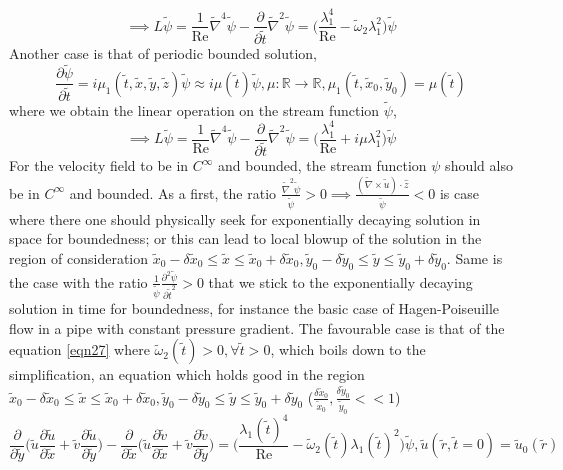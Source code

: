 \documentclass{article}
\begin{document}
\begin{equation} \label{eqn27}
\implies L \tilde{\psi} =  \frac{1}{\operatorname{Re}}\tilde{\nabla}^4 \tilde{\psi} - \frac{\partial}{\partial \tilde{t}} \tilde{\nabla}^2 \tilde{\psi} = \bigg(\frac{\lambda_1^4}{\operatorname{Re}}-\tilde{\omega}_2\lambda_1^2\bigg)\tilde{\psi}
\end{equation}
Another case is that of periodic bounded solution,
\begin{equation*}
\frac{\partial \tilde{\psi}}{\partial \tilde{t}} = i\mu_1(\tilde{t},\tilde{x}, \tilde{y}, \tilde{z}) \tilde{\psi} \approx i\mu(\tilde{t})\tilde{\psi}, \mu :\mathbb{R}\to\mathbb{R}, \mu_1(\tilde{t},\tilde{x}_0,\tilde{y}_0) = \mu(\tilde{t})
\end{equation*}
where we obtain the linear operation on the stream function $\tilde{\psi}$,
\begin{equation*}
\implies L \tilde{\psi} =  \frac{1}{\operatorname{Re}}\tilde{\nabla}^4 \tilde{\psi} - \frac{\partial}{\partial \tilde{t}} \tilde{\nabla}^2 \tilde{\psi} = \bigg(\frac{\lambda_1^4}{\operatorname{Re}}+i\mu\lambda_1^2\bigg)\tilde{\psi}
\end{equation*}
For the velocity field to be in $C^{\infty}$ and bounded, the stream function $\psi$ should also be in $C^{\infty}$ and bounded. As a first, the ratio $\frac{\tilde{\nabla}^2 \tilde{\psi}}{\tilde{\psi}} > 0 \implies \frac{(\tilde{\nabla}\times\tilde{u})\cdot\hat{z}}{\tilde{\psi}} < 0$ is case where there one should physically seek for exponentially decaying solution in space for boundedness; or this can lead to local blowup of the solution in the region of consideration $\tilde{x}_0 - \delta \tilde{x}_0 \le \tilde{x} \le \tilde{x}_0 + \delta \tilde{x}_0, \tilde{y}_0 - \delta \tilde{y}_0 \le \tilde{y} \le \tilde{y}_0 + \delta \tilde{y}_0$. Same is the case with the ratio $\frac{1}{\tilde{\psi}}\frac{\partial^2 \tilde{\psi}}{\partial \tilde{t}^2} > 0$ that we stick to the exponentially decaying solution in time for boundedness, for instance the basic case of Hagen-Poiseuille flow in a pipe with constant pressure gradient. The favourable case is that of the equation \ref{eqn27} where $\tilde{\omega}_2(\tilde{t}) > 0, \forall \tilde{t} > 0$, which boils down to the simplification, an equation which holds good in the region $\tilde{x}_0 - \delta \tilde{x}_0 \le \tilde{x} \le \tilde{x}_0 + \delta \tilde{x}_0, \tilde{y}_0 - \delta \tilde{y}_0 \le \tilde{y} \le \tilde{y}_0 + \delta \tilde{y}_0$ ($\frac{\delta \tilde{x}_0}{\tilde{x}_0}, \frac{\delta \tilde{y}_0}{\tilde{y}_0} << 1$)
\begin{equation*}
\frac{\partial}{\partial \tilde{y}}\bigg(\tilde{u}\frac{\partial \tilde{u}}{\partial \tilde{x}}+\tilde{v}\frac{\partial \tilde{u}}{\partial \tilde{y}}\bigg)-\frac{\partial}{\partial \tilde{x}}\bigg(\tilde{u}\frac{\partial \tilde{v}}{\partial \tilde{x}}+\tilde{v}\frac{\partial \tilde{v}}{\partial \tilde{y}}\bigg) = \bigg(\frac{\lambda_1(\tilde{t})^4}{\operatorname{Re}}-\tilde{\omega}_2(\tilde{t})\lambda_1(\tilde{t})^2\bigg)\tilde{\psi}, \tilde{u}(\tilde{r},\tilde{t} = 0) = \tilde{u}_0(\tilde{r})
\end{equation*}
\end{document}
